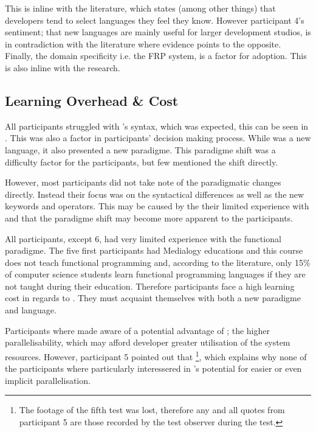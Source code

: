 This is inline with the literature, which states (among other things) that developers tend to select languages they feel they know\cite{meyerovich2013empirical}. However participant 4's sentiment; that new languages are mainly useful for larger development studios, is in contradiction with the literature where evidence points to the opposite. Finally, the domain specificity i.e. the \gls{FRP} system, is a factor for adoption. This is also inline with the research.

\subsection{Learning Overhead \& Cost}
All participants struggled with \fs's syntax, which was expected, this can be seen in . This was also a factor in participants' decision making process. While \fs was a new language, it also presented a new paradigme. This paradigme shift was a difficulty factor for the participants, but few mentioned the shift directly.


However, most participants did not take note of the paradigmatic changes directly. Instead their focus was on the syntactical differences as well as the new keywords and operators. This may be caused by the their limited experience with \fs and that the paradigme shift may become more apparent to the participants.



All participants, except 6, had very limited experience with the functional paradigme. The five first participants had Medialogy educations and this course does not teach functional programming and, according to the literature, only 15\% of computer science students learn functional programming languages if they are not taught during their education\cite{meyerovich2013empirical}. Therefore participants face a high learning cost in regards to \fs. They must acquaint themselves with both a new paradigme and language.

Participants where made aware of a potential advantage of \fs; the higher parallelisability, which may afford developer greater utilisation of the system resources. However, participant 5 pointed out that \footnote{The footage of the fifth test was lost, therefore any and all quotes from participant 5 are those recorded by the test observer during the test.}, which explains why none of the participants where particularly interessered in \fs's potential for easier or even implicit parallelisation.

